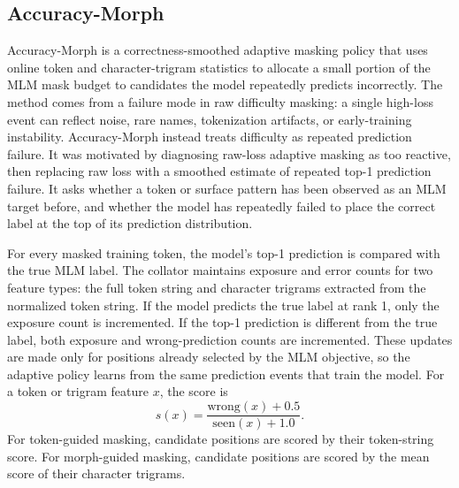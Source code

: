 \documentclass[11pt]{article}
\begin{document}
\subsection{Accuracy-Morph}

Accuracy-Morph is a correctness-smoothed adaptive masking policy that uses online token and character-trigram statistics to allocate a small portion of the MLM mask budget to candidates the model repeatedly predicts incorrectly.
The method comes from a failure mode in raw difficulty masking: a single high-loss event can reflect noise, rare names, tokenization artifacts, or early-training instability.
Accuracy-Morph instead treats difficulty as repeated prediction failure.
It was motivated by diagnosing raw-loss adaptive masking as too reactive, then replacing raw loss with a smoothed estimate of repeated top-1 prediction failure.
It asks whether a token or surface pattern has been observed as an MLM target before, and whether the model has repeatedly failed to place the correct label at the top of its prediction distribution.

For every masked training token, the model's top-1 prediction is compared with the true MLM label.
The collator maintains exposure and error counts for two feature types: the full token string and character trigrams extracted from the normalized token string.
If the model predicts the true label at rank 1, only the exposure count is incremented.
If the top-1 prediction is different from the true label, both exposure and wrong-prediction counts are incremented.
These updates are made only for positions already selected by the MLM objective, so the adaptive policy learns from the same prediction events that train the model.
For a token or trigram feature $x$, the score is
\begin{equation}
s(x) = \frac{\mathrm{wrong}(x) + 0.5}{\mathrm{seen}(x) + 1.0}.
\end{equation}
For token-guided masking, candidate positions are scored by their token-string score.
For morph-guided masking, candidate positions are scored by the mean score of their character trigrams.
\end{document}
